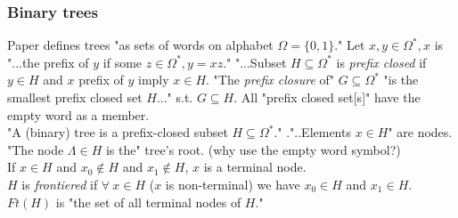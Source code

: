 \subsubsection{Binary trees}
Paper defines trees "as sets of words on alphabet $\Omega = \{ 0,1 \}$."  Let $x,y \in \Omega^{*}, x$ is "...the prefix of $y$ if some $z \in \Omega^{*}, y = xz$."  
"...Subset $H \subseteq \Omega^{*}$ is \textit{prefix closed} if $y \in H$ and $x$ prefix of $y$ imply $x \in H$.   
"The \textit{prefix closure} of" $G \subseteq \Omega^{*}$ "is the smallest prefix closed set $H$..." s.t. $G \subseteq H$.  All "prefix closed set[s]" have the empty word as a member.\\

"A (binary) tree is a prefix-closed subset $H \subseteq \Omega^{*}$."  ."..Elements $x \in H$" are nodes.  "The node $\Lambda \in H$ is the" tree's root.  (why use the empty word symbol?)\\
If $x \in H$ and $x_0 \notin H$ and $x_1 \notin H$, $x$ is a terminal node.\\
$H$ is \textit{frontiered} if $\forall \ x \in H$ ($x$ is non-terminal) we have $x_0 \in H$ and $x_1 \in H$. $Ft(H)$ is "the set of all terminal nodes of $H$."

